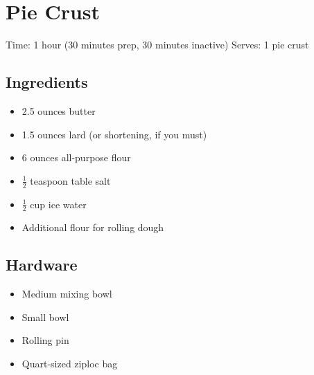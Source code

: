 \section{Pie Crust}
\label{pieCrust}
\setcounter{secnumdepth}{0}
Time: 1 hour (30 minutes prep, 30 minutes inactive)
Serves: 1 pie crust

\begin{multicols}{2}
\subsection*{Ingredients}
\begin{itemize}
    \item 2.5 ounces butter
    \item 1.5 ounces lard (or shortening, if you must)
    \item 6 ounces all-purpose flour
    \item \( \frac{1}{2} \) teaspoon table salt
    \item \( \frac{1}{2} \) cup ice water
    \item Additional flour for rolling dough
\end{itemize}

\subsection*{Hardware}
\begin{itemize}
    \item Medium mixing bowl
    \item Small bowl
    \item Rolling pin
    \item Quart-sized ziploc bag
\end{itemize}
\clearpage


\end{multicols}
